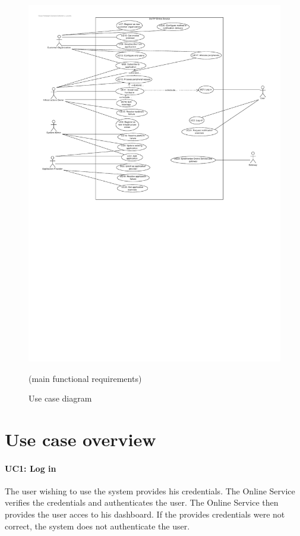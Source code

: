 \documentclass[english]{sareport}
\begin{document}
\begin{figure}[H]
    \centering
    \includegraphics[width=\textwidth]{Use_Case_Diagram.pdf}
    \caption{Use case diagram} (main functional requirements) \label{fig:Use_Case_Diagram}
\end{figure}

\section{Use case overview}\label{sec:uc_overview}
\paragraph{UC1: Log in}
The user wishing to use the system provides his credentials.
The Online Service verifies the credentials and authenticates the user.
The Online Service then provides the user acces to his dashboard.
If the provides credentials were not correct, the system does not authenticate the user.
\end{document}
